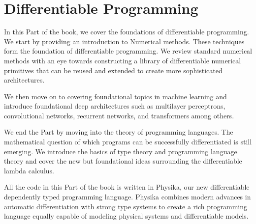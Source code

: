 \documentclass[book.tex]{subfiles}
\begin{document}
\part{Differentiable Programming}
\label{part:diffprog}

In this Part of the book, we cover the foundations of differentiable programming. We start by providing an introduction to Numerical methods. These techniques form the foundation of differentiable programming. We review standard numerical methods with an eye towards constructing a library of differentiable numerical primitives that can be reused and extended to create more sophisticated architectures.

We then move on to covering foundational topics in machine learning and introduce foundational deep architectures such as multilayer perceptrons, convolutional networks, recurrent networks, and transformers among others.

We end the Part by moving into the theory of programming languages. The mathematical question of which programs can be successfully differentiated is still emerging. We introduce the basics of type theory and programming language theory and cover the new but foundational ideas surrounding the differentiable lambda calculus.

All the code in this Part of the book is written in Physika, our new differentiable dependently typed programming language. Physika combines modern advances in automatic differentiation with strong type systems to create a rich programming language equally capable of modeling physical systems and differentiable models.



%


\end{document}
